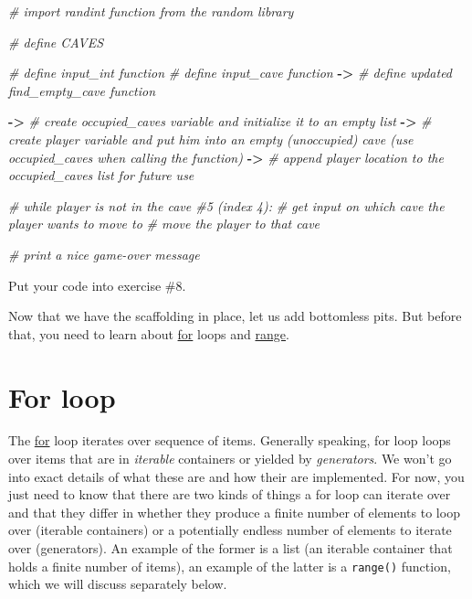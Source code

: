 \documentclass[
]{book}
\newenvironment{Shaded}{\begin{snugshade}}{\end{snugshade}}
\newcommand{\CommentTok}[1]{\textcolor[rgb]{0.56,0.35,0.01}{\textit{#1}}}
\newcommand{\OperatorTok}[1]{\textcolor[rgb]{0.81,0.36,0.00}{\textbf{#1}}}
\begin{document}
\begin{Shaded}
\begin{Highlighting}[]
\CommentTok{\# import randint function from the random library}

\CommentTok{\# define CAVES}

\CommentTok{\# define input\_int function}
\CommentTok{\# define input\_cave function}
\OperatorTok{{-}\textgreater{}} \CommentTok{\# define updated find\_empty\_cave function }

\OperatorTok{{-}\textgreater{}} \CommentTok{\# create \textasciigrave{}occupied\_caves\textasciigrave{} variable and initialize it to an empty list}
\OperatorTok{{-}\textgreater{}} \CommentTok{\# create \textasciigrave{}player\textasciigrave{} variable and put him into an empty (unoccupied) cave (use \textasciigrave{}occupied\_caves\textasciigrave{} when calling the function)}
\OperatorTok{{-}\textgreater{}} \CommentTok{\# append player location to the \textasciigrave{}occupied\_caves\textasciigrave{} list for future use}

\CommentTok{\# while player is not in the cave \#5 (index 4):}
    \CommentTok{\# get input on which cave the player wants to move to}
    \CommentTok{\# move the player to that cave}

\CommentTok{\# print a nice game{-}over message}
\end{Highlighting}
\end{Shaded}

Put your code into exercise \#8.

Now that we have the scaffolding in place, let us add bottomless pits. But before that, you need to learn about \href{https://docs.python.org/3/tutorial/controlflow.html\#for-statements}{for} loops and \href{https://docs.python.org/3/tutorial/controlflow.html\#the-range-function}{range}.

\hypertarget{for-loop}{%
\section{For loop}\label{for-loop}}

The \href{https://docs.python.org/3/tutorial/controlflow.html\#for-statements}{for} loop iterates over sequence of items. Generally speaking, for loop loops over items that are in \emph{iterable} containers or yielded by \emph{generators}. We won't go into exact details of what these are and how their are implemented. For now, you just need to know that there are two kinds of things a for loop can iterate over and that they differ in whether they produce a finite number of elements to loop over (iterable containers) or a potentially endless number of elements to iterate over (generators). An example of the former is a list (an iterable container that holds a finite number of items), an example of the latter is a \texttt{range()} function, which we will discuss separately below.
\end{document}
